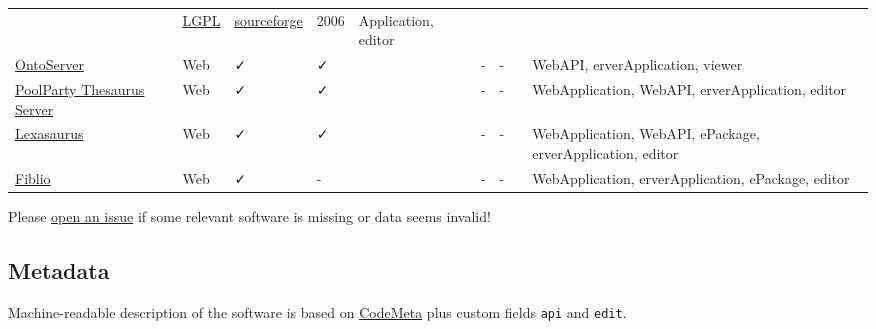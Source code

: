\documentclass[
  DIV=10]{article}
\begin{document}
\begin{longtable}[]{@{}lllllllll@{}}
& \href{https://spdx.org/licenses/LGPL-3.0-or-later}{LGPL} &
\href{https://sourceforge.net/projects/thmanager/}{sourceforge} & 2006 &
Application, editor \\
\href{https://ontoserver.csiro.au/}{OntoServer} & Web & ✓ & ✓ & & - & -
& & WebAPI, erverApplication, viewer \\
\href{https://www.poolparty.biz/poolparty-thesaurus-manager}{PoolParty
Thesaurus Server} & Web & ✓ & ✓ & & - & - & & WebApplication, WebAPI,
erverApplication, editor \\
\href{http://www.k-int.com/products/lexaurus/}{Lexasaurus} & Web & ✓ & ✓
& & - & - & & WebApplication, WebAPI, ePackage, erverApplication,
editor \\
\href{https://www.fiblio.de/}{Fiblio} & Web & ✓ & - & & - & - & &
WebApplication, erverApplication, ePackage, editor \\

\end{longtable}

Please
\href{https://github.com/gbv/bartoc-vocabulary-software/issues}{open an
issue} if some relevant software is missing or data seems invalid!

\newpage
{}
\recalctypearea

\subsection{Metadata}\label{metadata}

Machine-readable description of the software is based on
\href{https://codemeta.github.io/}{CodeMeta} plus custom fields
\texttt{api} and \texttt{edit}.
\end{document}
